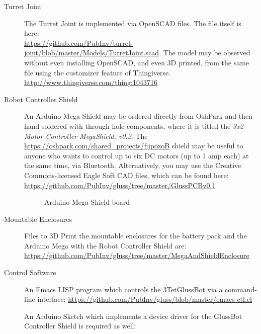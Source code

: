 \documentclass[11pt]{article}
\begin{document}
\begin{description}
  
\item [Turret Joint]
  The Turret Joint is implemented via OpenSCAD files. The file itself is here:\\
  \href{https://github.com/PubInv/turret-joint/blob/master/Models/TurretJoint.scad}
       {https://github.com/PubInv/turret-joint/blob/master/Models/TurretJoint.scad}.
       The model may be observed without even installing OpenSCAD, and even 3D printed,
       from the same file using the customizer feature of Thingiverse.\\
       \href{http://www.thingiverse.com/thing:1043716}{http://www.thingiverse.com/thing:1043716}
  
\item [Robot Controller Shield]
  An Arduino Mega Shield may be ordered directly from OshPark and then hand-soldered with through-hole components,
  where it is titled the \emph{3x2 Motor Controller MegaShield, v0.2}.
  The \href{https://oshpark.com/shared_projects/fijpozoB}{https://oshpark.com/shared\_projects/fijpozoB} shield
  may be useful to anyone who wants to control up to six DC motors (up to 1 amp each) at the same time, via Bluetooth.
  Alternatively, you may use the Creative Commons-licensed Eagle Soft CAD files, which can be found here:
  \href{https://github.com/PubInv/gluss/tree/master/GlussPCBv0.1}
  {https://github.com/PubInv/gluss/tree/master/GlussPCBv0.1}
   \begin{figure}[!ht]
     \centering
     \caption{Arduino Mega Shield board}
   \end{figure}

\item [Mountable Enclosures]
  Files to 3D Print the mountable enclosures for the battery pack and the Arduino Mega with the Robot Controller Shield are:\\
  \href{https://github.com/PubInv/gluss/tree/master/MegaAndShieldEnclosure}{https://github.com/PubInv/gluss/tree/master/MegaAndShieldEnclosure}

\item [Control Software]
An Emacs LISP program which controls the 3TetGlussBot via a command-line interface:
\href{https://github.com/PubInv/gluss/blob/master/emacs-ctl.el}{https://github.com/PubInv/gluss/blob/master/emacs-ctl.el}

An Arduino Sketch which implements a device driver for the GlussBot Controller Shield is required as well:


\end{description}
\end{document}
